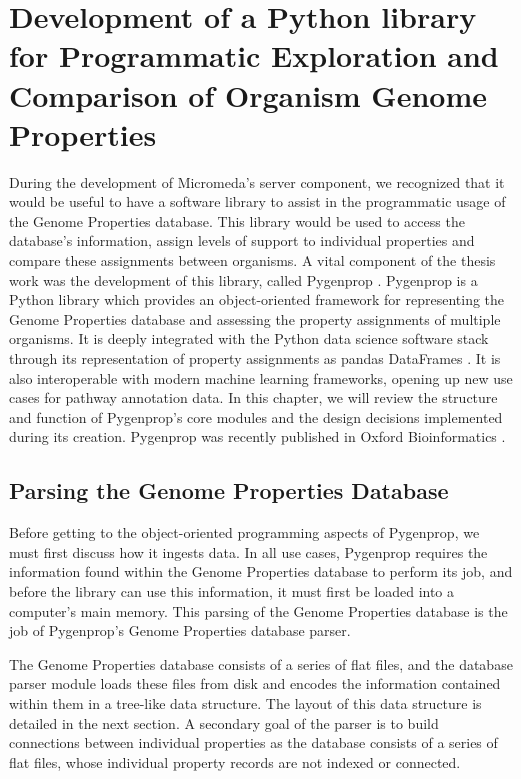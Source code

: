 \chapter{Development of a Python library for Programmatic Exploration and Comparison of Organism Genome Properties}

During the development of Micromeda's server component, we recognized that it would be useful to have a software library to assist in the programmatic usage of the Genome Properties database. This library would be used to access the database's information, assign levels of support to individual properties and compare these assignments between organisms. A vital component of the thesis work was the development of this library, called Pygenprop \cite{bergstrand2019pygenprop}. Pygenprop is a Python library which provides an object-oriented framework \cite{booch1986object} for representing the Genome Properties database and assessing the property assignments of multiple organisms. It is deeply integrated with the Python data science software stack \cite{scipystack} through its representation of property assignments as pandas DataFrames  \cite{mckinney2010data}. It is also interoperable with modern machine learning frameworks, opening up new use cases for pathway annotation data. In this chapter, we will review the structure and function of Pygenprop's core modules and the design decisions implemented during its creation. Pygenprop was recently published in Oxford Bioinformatics \cite{bergstrand2019pygenprop}.

\section{Parsing the Genome Properties Database}

Before getting to the object-oriented programming aspects of Pygenprop, we must first discuss how it ingests data. In all use cases, Pygenprop requires the information found within the Genome Properties database to perform its job, and before the library can use this information, it must first be loaded into a computer's main memory.  This parsing of the Genome Properties database is the job of Pygenprop's Genome Properties database parser.

The Genome Properties database consists of a series of flat files, and the database parser module loads these files from disk and encodes the information contained within them in a tree-like data structure. The layout of this data structure is detailed in the next section. A secondary goal of the parser is to build connections between individual properties as the database consists of a series of flat files, whose individual property records are not indexed or connected. 

